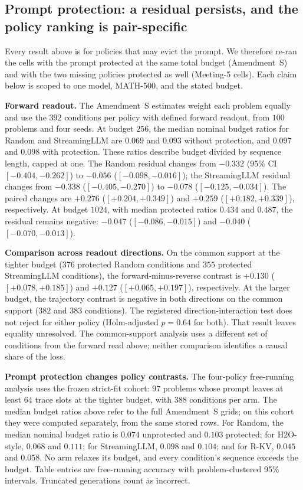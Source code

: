 \documentclass{article}
\begin{document}
\subsection{Prompt protection: a residual persists, and the policy ranking is pair-specific}
\label{sec:protection}
Every result above is for policies that may evict the prompt. We therefore re-ran the cells with the prompt protected at the same total budget (Amendment~S) and with the two missing policies protected as well (Meeting-5 cells). Each claim below is scoped to one model, MATH-500, and the stated budget.

\textbf{Forward readout.} The Amendment~S estimates weight each problem equally and use the $392$ conditions per policy with defined forward readout, from $100$ problems and four seeds. At budget $256$, the median nominal budget ratios for Random and StreamingLLM are $0.069$ and $0.093$ without protection, and $0.097$ and $0.098$ with protection. These ratios describe budget divided by sequence length, capped at one. The Random residual changes from $-0.332$ (95\% CI $[-0.404,-0.262]$) to $-0.056$ ($[-0.098,-0.016]$); the StreamingLLM residual changes from $-0.338$ ($[-0.405,-0.270]$) to $-0.078$ ($[-0.125,-0.034]$). The paired changes are $+0.276$ ($[+0.204,+0.349]$) and $+0.259$ ($[+0.182,+0.339]$), respectively. At budget $1024$, with median protected ratios $0.434$ and $0.487$, the residual remains negative: $-0.047$ ($[-0.086,-0.015]$) and $-0.040$ ($[-0.070,-0.013]$).

\textbf{Comparison across readout directions.} On the common support at the tighter budget ($376$ protected Random conditions and $355$ protected StreamingLLM conditions), the forward-minus-reverse contrast is $+0.130$ ($[+0.078,+0.185]$) and $+0.127$ ($[+0.065,+0.197]$), respectively. At the larger budget, the trajectory contrast is negative in both directions on the common support ($382$ and $383$ conditions). The registered direction-interaction test does not reject for either policy (Holm-adjusted $p=0.64$ for both). That result leaves equality unresolved. The common-support analysis uses a different set of conditions from the forward read above; neither comparison identifies a causal share of the loss.

\textbf{Prompt protection changes policy contrasts.} The four-policy free-running analysis uses the frozen strict-fit cohort: $97$ problems whose prompt leaves at least $64$ trace slots at the tighter budget, with $388$ conditions per arm. The median budget ratios above refer to the full Amendment~S grids; on this cohort they were computed separately, from the same stored rows. For Random, the median nominal budget ratio is $0.074$ unprotected and $0.103$ protected; for H2O-style, $0.068$ and $0.111$; for StreamingLLM, $0.098$ and $0.104$; and for R-KV, $0.045$ and $0.058$. No arm relaxes its budget, and every condition's sequence exceeds the budget. Table entries are free-running accuracy with problem-clustered 95\% intervals. Truncated generations count as incorrect.
\end{document}
